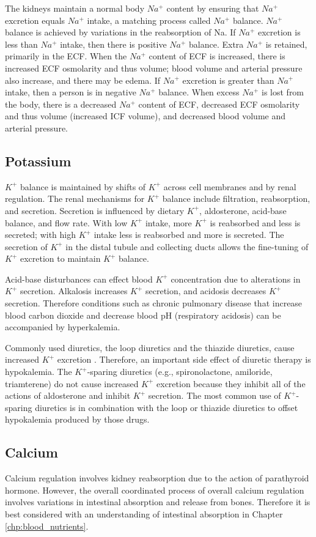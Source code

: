 The kidneys maintain a normal body $Na^+$ content by ensuring that $Na^+$ excretion equals $Na^+$ intake, a matching process called $Na^+$ balance. $Na^+$ balance is achieved by variations in the reabsorption of Na.  If $Na^+$ excretion is less than $Na^+$ intake, then there is positive $Na^+$ balance. Extra $Na^+$ is retained, primarily in the ECF. When the $Na^+$ content of ECF is increased, there is increased ECF osmolarity and thus volume; blood volume and arterial pressure also increase, and there may be edema. If $Na^+$ excretion is greater than $Na^+$ intake, then a person is in negative $Na^+$ balance. When excess $Na^+$ is lost from the body, there is a decreased $Na^+$ content of ECF, decreased ECF osmolarity and thus volume (increased ICF volume), and decreased blood volume and arterial pressure. 


\subsection{Potassium}
$K^+$ balance is maintained by shifts of $K^+$ across cell membranes and by renal regulation. The renal mechanisms for $K^+$ balance include filtration, reabsorption, and secretion. Secretion is influenced by dietary $K^+$, aldosterone, acid-base balance, and flow rate. With low $K^+$ intake, more $K^+$ is reabsorbed and less is secreted; with high $K^+$ intake less is reabsorbed and more is secreted. The secretion of  $K^+$ in the distal tubule and collecting ducts allows the fine-tuning of $K^+$ excretion to maintain $K^+$ balance.

Acid-base disturbances can  effect blood $K^+$ concentration due to alterations in $K^+$ secretion. Alkalosis increases $K^+$ secretion, and acidosis decreases $K^+$ secretion. Therefore conditions such as chronic pulmonary disease that increase blood carbon dioxide and decrease blood pH (respiratory acidosis) can be accompanied by hyperkalemia. 

Commonly used diuretics, the loop diuretics and the thiazide diuretics, cause increased $K^+$ excretion . Therefore, an important side effect of diuretic therapy is hypokalemia. The $K^+$-sparing diuretics (e.g., spironolactone, amiloride, triamterene) do not cause increased $K^+$ excretion because they inhibit all of the actions of aldosterone and inhibit $K^+$ secretion. The most common use of $K^+$-sparing diuretics is in combination with the loop or thiazide diuretics to offset hypokalemia produced by those drugs. 

\subsection{Calcium}
Calcium regulation involves kidney reabsorption due to the action of parathyroid hormone. However, the overall coordinated process of overall calcium regulation involves variations in intestinal absorption and release from bones. Therefore it is best considered with an understanding of intestinal absorption in Chapter \ref{chp:blood_nutrients}.


